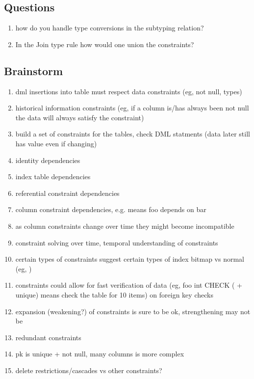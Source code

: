 \documentclass[12pt]{article}
\begin{document}
\subsection{Questions}
\begin{enumerate}
  \item how do you handle type conversions in the subtyping relation?
  \item In the Join type rule how would one union the constraints?
\end{enumerate}

\subsection{Brainstorm}
\begin{enumerate}
  \item dml insertions into table must respect data constraints (eg, not null, types)
  \item historical information constraints (eg, if a column is/has always been not null the data will always satisfy the constraint)
  \item build a set of constraints for the tables, check DML statments (data later still has value even if changing)
  \item identity dependencies
  \item index table dependencies
  \item referential constraint dependencies
  \item column constraint dependencies, e.g.  means foo depends on bar
  \item as column constraints change over time they might become incompatible
  \item constraint solving over time, temporal understanding of constraints
  \item certain types of constraints suggest certain types of index bitmap vs normal (eg, )
  \item constraints could allow for fast verification of data (eg, foo int CHECK ( + unique) means check the table for 10 items) on foreign key checks
  \item expansion (weakening?) of constraints is sure to be ok, strengthening may not be
  \item redundant constraints
  \item pk is unique + not null, many columns is more complex
  \item delete restrictions/cascades vs other constraints?

\end{enumerate}
\end{document}
